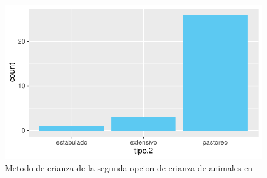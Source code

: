 \documentclass[12pt]{article}\usepackage[]{graphicx}\usepackage[]{xcolor}
\makeatletter
\def\maxwidth{ %
  \ifdim\Gin@nat@width>\linewidth
    \linewidth
  \else
    \Gin@nat@width
  \fi
}
\newenvironment{knitrout}{}{} %
\makeatother
\begin{document}
	\begin{figure}[H]
	\centering
\begin{knitrout}
\color{fgcolor}
\includegraphics[width=\maxwidth]{figure/twenty-1} 
\end{knitrout}
	\caption{Metodo de crianza de la segunda opcion de crianza de animales en \comunidad}
	\end{figure}
	
\end{document}
